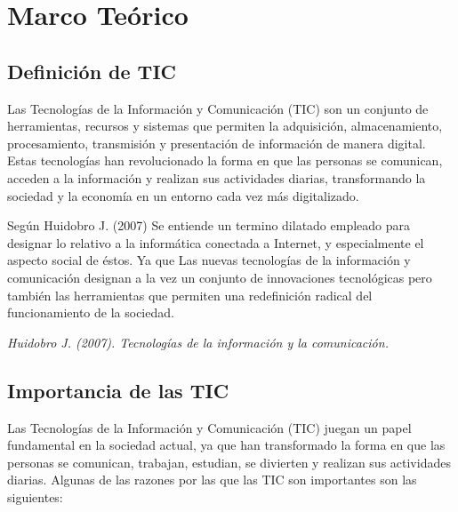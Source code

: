 \documentclass{article}
\begin{document}
\newpage

\section{Marco Teórico}

  \subsection{Definición de TIC}

    Las Tecnologías de la Información y Comunicación (TIC) son un conjunto de herramientas, recursos y sistemas que permiten la adquisición, almacenamiento, procesamiento, transmisión y presentación de información de manera digital. Estas tecnologías han revolucionado la forma en que las personas se comunican, acceden a la información y realizan sus actividades diarias, transformando la sociedad y la economía en un entorno cada vez más digitalizado.

    Según Huidobro J. (2007) Se entiende un termino dilatado empleado para designar lo relativo a la informática conectada a Internet, y especialmente el aspecto social de éstos. Ya que Las nuevas tecnologías de la información y comunicación designan a la vez un conjunto de innovaciones tecnológicas pero también las herramientas que permiten una redefinición radical del funcionamiento de la sociedad.

    \begin{flushright}
      \textit{Huidobro J. (2007). Tecnologías de la información y la comunicación.}
    \end{flushright}



  \subsection{Importancia de las TIC}

    Las Tecnologías de la Información y Comunicación (TIC) juegan un papel fundamental en la sociedad actual, ya que han transformado la forma en que las personas se comunican, trabajan, estudian, se divierten y realizan sus actividades diarias. Algunas de las razones por las que las TIC son importantes son las siguientes:
\end{document}
